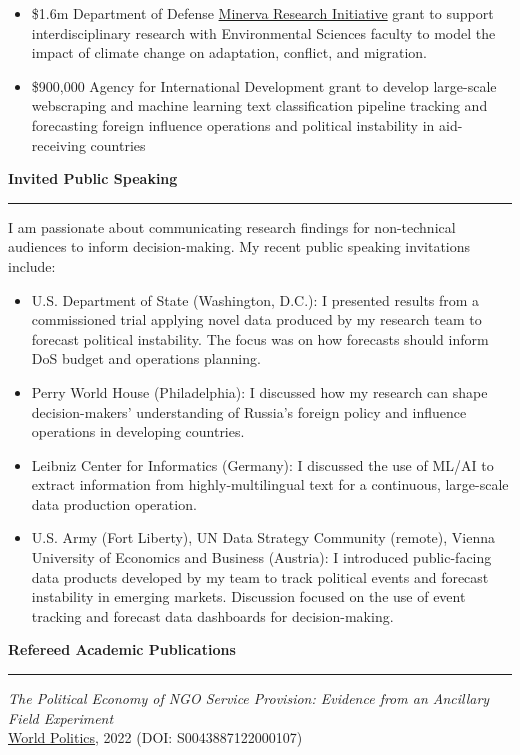 \documentclass[11pt]{article}
\begin{document}
\begin{itemize} \itemsep -5pt
  \item \$1.6m Department of Defense \href{https://minerva.defense.gov/Research/Funded-Projects/Article/3956358/modeling-climate-induced-societal-adaptation-and-population/}{Minerva Research Initiative} grant to support interdisciplinary research with Environmental Sciences faculty to model the impact of climate change on adaptation, conflict, and migration.
  \item \$900,000 Agency for International Development grant to develop large-scale webscraping and machine learning text classification pipeline tracking and forecasting foreign influence operations and political instability in aid-receiving countries
\end{itemize}

\textbf{\large Invited Public Speaking}\\
\rule[3mm]{\textwidth}{.2pt}
I am passionate about communicating research findings for non-technical audiences to inform decision-making. My recent public speaking invitations include:

\begin{itemize} \itemsep -5pt
  \item U.S. Department of State (Washington, D.C.): I presented results from a commissioned trial applying novel data produced by my research team to forecast political instability. The focus was on how forecasts should inform DoS budget and operations planning.
  \item Perry World House (Philadelphia): I discussed how my research can shape decision-makers' understanding of Russia's foreign policy and influence operations in developing countries.
  \item Leibniz Center for Informatics (Germany): I discussed the use of ML/AI to extract information from highly-multilingual text for a continuous, large-scale data production operation.
  \item U.S. Army (Fort Liberty), UN Data Strategy Community (remote), Vienna University of Economics and Business (Austria): I introduced public-facing data products developed by my team to track political events and forecast instability in emerging markets. Discussion focused on the use of event tracking and forecast data dashboards for decision-making.
\end{itemize}

\textbf{\large Refereed Academic Publications}\\
\rule[3mm]{\textwidth}{.2pt}
{\sl The Political Economy of NGO Service Provision: Evidence from an Ancillary Field Experiment}\\
\href{https://www.cambridge.org/core/journals/world-politics/article/abs/political-economy-of-ngo-service-provision/D5265B6C0EA842B788BCB309EF4E5178}{World Politics}, 2022 (DOI: S0043887122000107)
\end{document}
